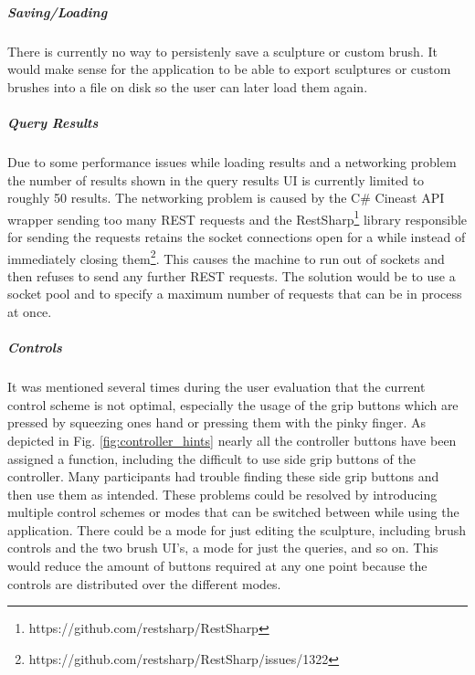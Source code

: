 \subparagraph{Saving/Loading}
There is currently no way to persistenly save a sculpture or custom brush. It would make sense for the application to be able to export sculptures or custom brushes into a file on disk so the user can later load them again.

\subparagraph{Query Results}
Due to some performance issues while loading results and a networking problem the number of results shown in the query results UI is currently limited to roughly 50 results. The networking problem is caused by the C\# Cineast API wrapper sending too many REST requests and the RestSharp\footnote{https://github.com/restsharp/RestSharp} library responsible for sending the requests retains the socket connections open for a while instead of immediately closing them\footnote{https://github.com/restsharp/RestSharp/issues/1322}. This causes the machine to run out of sockets and then refuses to send any further REST requests. The solution would be to use a socket pool and to specify a maximum number of requests that can be in process at once.

\subparagraph{Controls}
It was mentioned several times during the user evaluation that the current control scheme is not optimal, especially the usage of the grip buttons which are pressed by squeezing ones hand or pressing them with the pinky finger. As depicted in Fig. \ref{fig:controller_hints} nearly all the controller buttons have been assigned a function, including the difficult to use side grip buttons of the controller. Many participants had trouble finding these side grip buttons and then use them as intended. These problems could be resolved by introducing multiple control schemes or modes that can be switched between while using the application. There could be a mode for just editing the sculpture, including brush controls and the two brush UI's, a mode for just the queries, and so on. This would reduce the amount of buttons required at any one point because the controls are distributed over the different modes.
